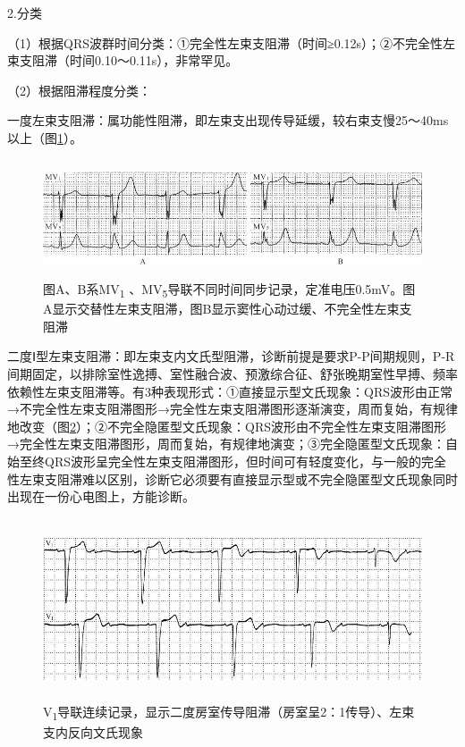 2.分类

（1）根据QRS波群时间分类：①完全性左束支阻滞（时间≥0.12s）；②不完全性左束支阻滞（时间0.10～0.11s），非常罕见。

（2）根据阻滞程度分类：

一度左束支阻滞：属功能性阻滞，即左束支出现传导延缓，较右束支慢25～40ms以上（图\ref{fig21-2}）。

\begin{figure}[!htbp]
 \centering
 \includegraphics[width=5.55208in,height=1.36458in]{./images/Image00350.jpg}
 \captionsetup{justification=centering}
 \caption{图A、B系MV\textsubscript{1} 、MV\textsubscript{5}导联不同时间同步记录，定准电压0.5mV。图A显示交替性左束支阻滞，图B显示窦性心动过缓、不完全性左束支阻滞}
 \label{fig21-2}
  \end{figure} 


二度Ⅰ型左束支阻滞：即左束支内文氏型阻滞，诊断前提是要求P-P间期规则，P-R间期固定，以排除室性逸搏、室性融合波、预激综合征、舒张晚期室性早搏、频率依赖性左束支阻滞等。有3种表现形式：①直接显示型文氏现象：QRS波形由正常→不完全性左束支阻滞图形→完全性左束支阻滞图形逐渐演变，周而复始，有规律地改变（图\ref{fig21-3}）；②不完全隐匿型文氏现象：QRS波形由不完全性左束支阻滞图形→完全性左束支阻滞图形，周而复始，有规律地演变；③完全隐匿型文氏现象：自始至终QRS波形呈完全性左束支阻滞图形，但时间可有轻度变化，与一般的完全性左束支阻滞难以区别，诊断它必须要有直接显示型或不完全隐匿型文氏现象同时出现在一份心电图上，方能诊断。

\begin{figure}[!htbp]
 \centering
 \includegraphics[width=5.61458in,height=2.11458in]{./images/Image00351.jpg}
 \captionsetup{justification=centering}
 \caption{V\textsubscript{1}导联连续记录，显示二度房室传导阻滞（房室呈2：1传导）、左束支内反向文氏现象}
 \label{fig21-3}
  \end{figure} 


